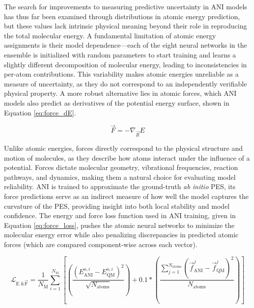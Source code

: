 The search for improvements to measuring predictive uncertainty in ANI models has thus far been examined through distributions in atomic energy prediction, but these values lack intrinsic physical meaning beyond their role in reproducing the total molecular energy. 
A fundamental limitation of atomic energy assignments is their model dependence—each of the eight neural networks in the ensemble is initialized with random parameters to start training and learns a slightly different decomposition of molecular energy, leading to inconsistencies in per-atom contributions. 
This variability makes atomic energies unreliable as a measure of uncertainty, as they do not correspond to an independently verifiable physical property.
A more robust alternative lies in atomic forces, which ANI models also predict as derivatives of the potential energy surface, shown in Equation \ref{eq:force_dE}.

\begin{equation}
    \vec{F} = -\nabla_{\vec{R}} E
    \label{eq:force_dE}
\end{equation}

Unlike atomic energies, forces directly correspond to the physical structure and motion of molecules, as they describe how atoms interact under the influence of a potential. 
Forces dictate molecular geometry, vibrational frequencies, reaction pathways, and dynamics, making them a natural choice for evaluating model reliability.
ANI is trained to approximate the ground-truth \textit{ab initio} PES, its force predictions serve as an indirect measure of how well the model captures the curvature of the PES, providing insight into both local stability and model confidence.
The energy and force loss function used in ANI training, given in Equation \ref{eq:force_loss}, pushes the atomic neural networks to minimize the molecular energy error while also penalizing discrepancies in predicted atomic forces (which are compared component-wise across each vector). 

\begin{equation}
\mathcal{L}_{\text{E \& }\vec{\text{F}}} = 
\frac{1}{N_{\text{M}}} 
\sum_{i=1}^{N_\text{M}} 
\left[ \left( \frac{
\left( E_{\text{ANI}}^{\text{o},i} - E_{\text{QM}}^{\text{o},i} \right)^2}
{\sqrt{N_{\text{atoms}}}} \right)
+ 0.1 \ast \left( 
\frac{\sum_{j=1}^{N_{\text{atoms}}} 
\left( \vec{f}_{\text{ANI}}^{j} - \vec{f}_{\text{QM}}^{j}\right)^2}{N_{\text{atoms}}} 
\right) \right]
\label{eq:force_loss}
\end{equation}

